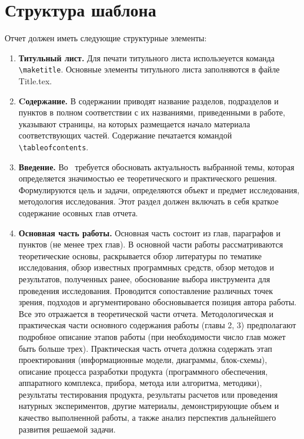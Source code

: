 \chapter{Структура шаблона}

Отчет должен иметь следующие структурные элементы:

\begin{enumerate}
    \item \textbf{Титульный лист.} Для печати титульного листа использеуется команда \verb|\maketitle|. 
    Основные элементы титульного листа заполняются в файле Title.tex.
    \item \textbf{Cодержание.} В содержании приводят название разделов, подразделов и пунктов в полном 
    соответствии с их названиями, приведенными в работе, указывают страницы, на которых размещается 
    начало материала соответствующих частей. Содержание печатается командой \verb|\tableofcontents|.
    \item \textbf{Введение.} Во \guillemotright\ требуется обосновать актуальность выбранной темы, которая определяется значимостью ее теоретического и практического решения. Формулируются цель и задачи, определяются объект и предмет исследования, методология исследования. Этот раздел должен включать в себя краткое содержание осовных глав отчета.
    \item \textbf{Основная часть работы.} Основная часть состоит из глав, параграфов и пунктов (не менее трех глав). 
    В основной части работы рассматриваются теоретические основы, раскрывается обзор литературы по тематике 
    исследования, обзор известных программных средств, обзор методов и результатов, полученных ранее,
    обоснование выбора инструмента для проведения исследования. Проводится сопоставление различных точек 
    зрения, подходов и аргументировано обосновывается позиция автора работы. Все это отражается в теоретической
    части отчета. Методологическая и практическая части основного содержания работы (главы 2, 3) предполагают
    подробное описание этапов работы (при необходимости число глав может быть больше трех). Практическая часть отчета должна содержать этап проектирования (информационные модели, диаграммы, блок-схемы), описание процесса разработки продукта (программного обеспечения, аппаратного комплекса, прибора, метода или алгоритма, методики), результаты тестирования продукта,  результаты расчетов или проведения натурных экспериментов, другие материалы, демонстрирующие объем и качество выполненной работы, а также анализ перспектив дальнейшего развития решаемой задачи.

\end{enumerate}
